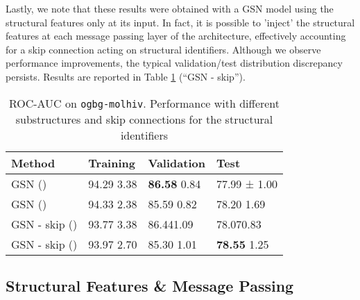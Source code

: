 \documentclass{article} \usepackage{iclr2021_conference,times}
\begin{document}
Lastly, we note that these results were obtained with a GSN model using the structural features only at its input. In fact, it is possible to 'inject' the structural features at each message passing layer of the architecture, effectively accounting for a skip connection acting on structural identifiers. Although we observe performance improvements, the typical validation/test distribution discrepancy persists. Results are reported in Table \ref{tab:ablation_molhiv_dataset} (``GSN - skip'').

\begin{table}[t!]
\caption{ROC-AUC on \texttt{ogbg-molhiv}. Performance with different substructures and skip connections for the structural identifiers}
        \begin{tabular}{l|lll}


        Method & Training & Validation & Test\\
        \hline
        GSN  ()&
        94.29   3.38&
        \textbf{ 86.58}   0.84 &
        77.99 ± 1.00\\

        GSN  ()&
        94.33    2.38&
        85.59   0.82&
        78.20    1.69\\
        
        
        GSN - skip ()&
        93.77  3.38&
         86.441.09&
        78.070.83\\
        
        GSN - skip ()&
        93.97    2.70 &
        85.30   1.01&
       \textbf{78.55}   1.25\\
\end{tabular}
          \label{tab:ablation_molhiv_dataset}
     \centering 
\end{table}






\subsection{Structural Features \& Message Passing}\label{deepset_appendix}
\end{document}

